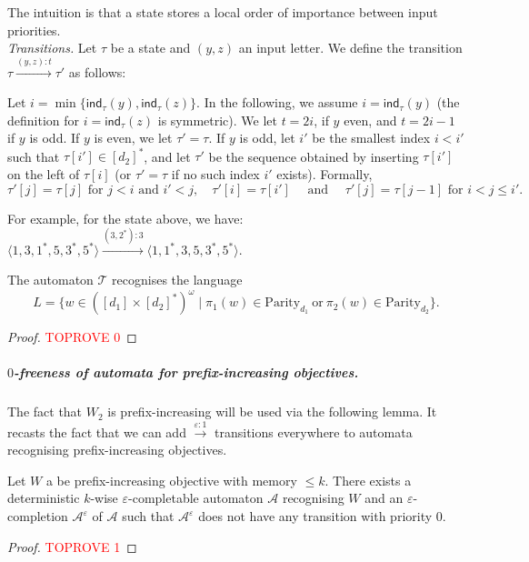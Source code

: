 \documentclass[a4paper,UKenglish,cleveref, thm-restate]{lipics-v2021}
\newcommand{\re}[1]{\xrightarrow{#1}}
\newcommand{\tand}{\text{ and }}
\newcommand{\tfor}{\text{ for }}
\newcommand{\Parity}{\mathrm{Parity}}
\newcommand{\eps}{\varepsilon}
\newcommand{\A}{\mathcal{A}}
\newcommand{\T}{\mathcal T}
\newcommand{\done}{[d_1]}
\newcommand{\dtwo}{[d_2]^*}
\newcommand{\indtau}[1]{\mathsf{ind}_\tau(#1)}
\begin{document}
The intuition is that a state stores a local order of importance between input priorities.\\

\textit{Transitions.}
Let $\tau$ be a state and $(y,z)$ an input letter. We define the transition $\tau \re{(y,z):t}\tau'$ as follows:

Let $i = \min \{ \indtau{y}, \indtau{z}\}$. 
In the following, we assume $i = \indtau{y}$ (the definition for $i = \indtau{z}$ is symmetric). 
We let $t = 2i$, if $y$ even, and  $t = 2i-1$ if $y$ is odd.
If $y$ is even, we let $\tau' = \tau$.
If $y$ is odd, let $i'$ be the smallest index $i<i'$ such that $\tau[i']\in \dtwo$, and let $\tau'$ be the sequence obtained by inserting $\tau[i']$ on the left of $\tau[i]$ (or $\tau' = \tau$ if no such index $i'$ exists). 
Formally,
\[ \tau'[j] = \tau[j] \tfor j<i \tand i'<j,  \quad \tau'[i] = \tau[i'] \quad \tand \quad \tau'[j] = \tau[j-1] \tfor i<j\leq i' .\]

For example, for the state above, we have:
$ \langle 1,3,1^*, 5, 3^*, 5^* \rangle  \re{ (3,2^*):3} \langle 1, 1^*, 3, 5, 3^*, 5^* \rangle. $\\
\begin{lemma}\label{lem:language-of-T}
    The automaton $\T$ recognises the language \[L = \{w \in (\done \times \dtwo)^\omega \mid \pi_1(w) \in \Parity_{d_1} \ \mathrm{or} \ \pi_2(w) \in \Parity_{d_2}\}.\]
\end{lemma}
\begin{proof}\textcolor{red}{TOPROVE 0}\end{proof}


\subparagraph{$0$-freeness of automata for prefix-increasing objectives.} The fact that $W_2$ is prefix-increasing will be used via the following lemma. It recasts the fact that we can add $\re{\eps:1}$ transitions everywhere to automata recognising prefix-increasing objectives.

\begin{lemma}\label{lem:prefix-increasing}
    Let $W$ a be prefix-increasing objective with memory $\leq k$.
    There exists a deterministic $k$-wise $\eps$-completable automaton $\A$ recognising $W$ and an $\eps$-completion $\A^\eps$ of $\A$ such that $\A^\eps$ does not have any transition with priority $0$.
\end{lemma}

\begin{proof}\textcolor{red}{TOPROVE 1}\end{proof}
\end{document}
